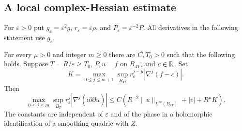 \subsection{A local complex-Hessian estimate}

For $\varepsilon>0$ put
$g_\varepsilon=\varepsilon^2g$, $r_\varepsilon=\varepsilon\rho$,
and $P_\varepsilon=\varepsilon^{-2}P$. All derivatives in the
following statement use $g_\varepsilon$.

\begin{proposition}\label{prop:local-hessian}
For every $\mu>0$ and integer $m\ge0$ there are $C,T_0>0$ such
that the following holds. Suppose $T=R/\varepsilon\ge T_0$,
$P_\varepsilon u=f$ on $B_{4T}$, and $c\in\mathbb R$. Set
\[
 K=\max_{0\le j\le m+1}\sup_{B_{4T}}
       r_\varepsilon^{j-\mu}|\nabla^j(f-c)|.
\]
Then
\begin{equation}\label{eq:local-hessian}
 \max_{0\le j\le m}\sup_{B_T}
 r_\varepsilon^j|\nabla^j(\mathrm i\partial\bar\partial u)|
 \le C\left(R^{-2}\|u\|_{L^\infty(B_{4T})}
                +|c|+R^\mu K\right).
\end{equation}
The constants are independent of $\varepsilon$ and of the phase in
a holomorphic identification of a smoothing quadric with $Z$.
\end{proposition}
